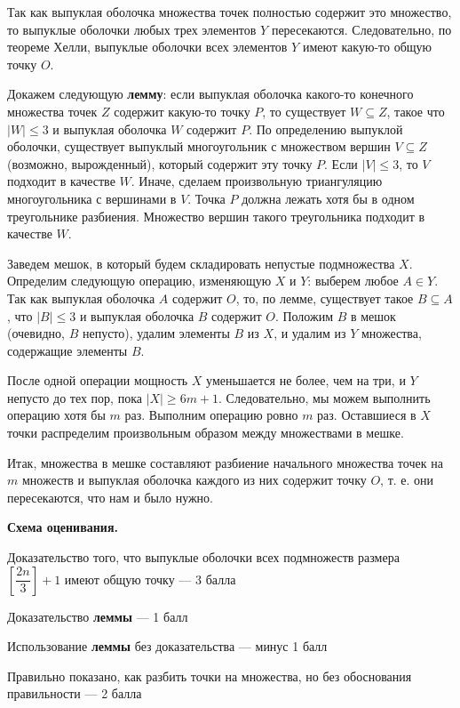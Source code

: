 \documentclass[12pt]{article}
\begin{document}
Так как выпуклая оболочка множества точек полностью содержит это множество, то выпуклые оболочки любых трех элементов $Y$ пересекаются. Следовательно, по теореме Хелли, выпуклые оболочки всех элементов $Y$ имеют какую-то общую точку $O$.

Докажем следующую \textbf{лемму}: если выпуклая оболочка какого-то конечного множества точек $Z$ содержит какую-то точку $P$, то существует $W \subseteq Z$, такое что $|W| \leq 3$ и выпуклая оболочка $W$ содержит $P$. По определению выпуклой оболочки, существует выпуклый многоугольник с множеством вершин $V \subseteq Z$ (возможно, вырожденный), который содержит эту точку $P$. Если $|V| \leq 3$, то $V$ подходит в качестве $W$. Иначе, сделаем произвольную триангуляцию многоугольника с вершинами в $V$. Точка $P$ должна лежать хотя бы в одном треугольнике разбиения. Множество вершин такого треугольника подходит в качестве $W$.

Заведем мешок, в который будем складировать непустые подмножества $X$. Определим следующую операцию, изменяющую $X$ и $Y$: выберем любое $A \in Y$. Так как выпуклая оболочка $A$ содержит $O$, то, по лемме, существует такое $B \subseteq A$, что $|B| \leq 3$ и выпуклая оболочка $B$ содержит $O$. Положим $B$ в мешок (очевидно, $B$ непусто), удалим элементы $B$ из $X$, и удалим из $Y$ множества, содержащие элементы $B$. 

После одной операции мощность $X$ уменьшается не более, чем на три, и $Y$ непусто до тех пор, пока $|X| \geq 6m + 1$. Следовательно, мы можем выполнить операцию хотя бы $m$ раз. Выполним операцию ровно $m$ раз. Оставшиеся в $X$ точки распределим произвольным образом между множествами в мешке. 

Итак, множества в мешке составляют разбиение начального множества точек на $m$ множеств и выпуклая оболочка каждого из них содержит точку $O$, т. е. они пересекаются, что нам и было нужно.

\bigskip

\textbf{Схема оценивания.}
\begin{compactitem}
\item Доказательство того, что выпуклые оболочки всех подмножеств размера $\left[\dfrac{2n}{3}\right] + 1$ имеют общую точку --- 3 балла
\item Доказательство \textbf{леммы} --- 1 балл
\item Использование \textbf{леммы} без доказательства --- минус 1 балл
\item Правильно показано, как разбить точки на множества, но без обоснования правильности --- 2 балла
\end{compactitem}
\end{document}
